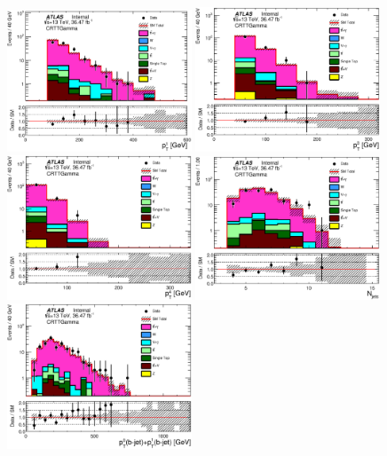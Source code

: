 \begin{figure}[htbp]
\begin{center}
\includegraphics[width=0.49\textwidth]{figures/ttGamma/postfit/JetPt_1__CRTTGamma_log.eps}
\includegraphics[width=0.49\textwidth]{figures/ttGamma/postfit/JetPt_3__CRTTGamma_log.eps}
\includegraphics[width=0.49\textwidth]{figures/ttGamma/postfit/JetPt_4__CRTTGamma_log.eps}
\includegraphics[width=0.49\textwidth]{figures/ttGamma/postfit/NJets_CRTTGamma_log.eps}
\includegraphics[width=0.49\textwidth]{figures/ttGamma/postfit/JetPt_JetLeadTagIndex_JetPt_JetSubleadTagIndex__CRTTGamma_log.eps}

\end{center}
\end{figure}
